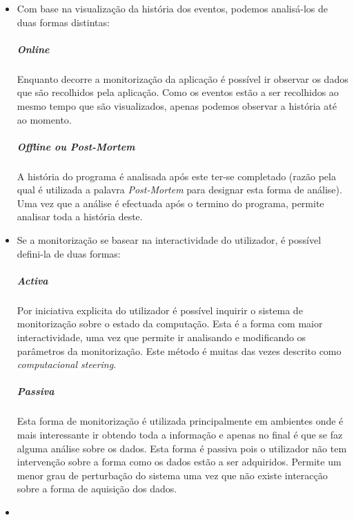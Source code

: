 \begin{itemize}
 \item 


Com base na visualização da história dos eventos, podemos analisá-los de duas formas distintas:
\subparagraph*{Online}
Enquanto decorre a monitorização da aplicação é possível ir observar os dados
que são recolhidos pela aplicação. Como os eventos estão a ser recolhidos ao
mesmo tempo que são visualizados, apenas podemos observar a história até ao
momento.

\subparagraph*{Offline ou \textit{Post-Mortem}}
A história do programa é analisada após este ter-se completado (razão pela qual
é utilizada a palavra \textit{Post-Mortem} para designar esta forma de análise).
Uma vez que a análise é efectuada após o termino do programa, permite analisar
toda a história deste.

\item

Se a monitorização se basear na interactividade do utilizador, é possível defini-la de duas formas:

\subparagraph*{Activa}

Por iniciativa explicita do utilizador é possível inquirir o sistema de monitorização sobre o estado da computação. Esta é a forma com maior interactividade, uma vez que permite ir analisando e modificando os parâmetros da monitorização. Este método é muitas das vezes descrito como \textit{computacional steering}.


\subparagraph*{Passiva}
Esta forma de monitorização é utilizada principalmente em ambientes onde é mais interessante ir obtendo toda a informação e apenas no final é que se faz alguma análise sobre os dados. Esta forma é passiva pois o utilizador não tem intervenção sobre a forma como os dados estão a ser adquiridos. Permite um menor grau de perturbação do sistema uma vez que não existe interacção sobre a forma de aquisição dos dados. 
\item


\end{itemize}
